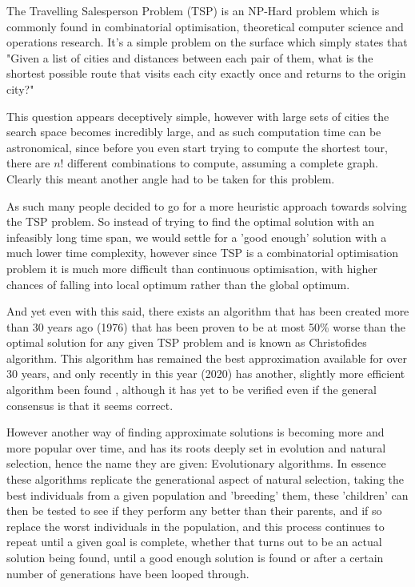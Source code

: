 \documentclass[11pt,a4paper,titlepage]{article}
\begin{document}
The Travelling Salesperson Problem (TSP) is an NP-Hard problem which is commonly found in combinatorial optimisation, theoretical computer science and operations research. It's a simple problem on the surface which simply states that "Given a list of cities and distances between each pair of them, what is the shortest possible route that visits each city exactly once and returns to the origin city?" \cite{TSPWiki}

This question appears deceptively simple, however with large sets of cities the search space becomes incredibly large, and as such computation time can be astronomical, since before you even start trying to compute the shortest tour, there are $n!$ different combinations to compute, assuming a complete graph. Clearly this meant another angle had to be taken for this problem.

As such many people decided to go for a more heuristic approach towards solving the TSP problem. So instead of trying to find the optimal solution with an infeasibly long time span, we would settle for a 'good enough' solution with a much lower time complexity, however since TSP is a combinatorial optimisation problem it is much more difficult than continuous optimisation, with higher chances of falling into local optimum rather than the global optimum.

And yet even with this said, there exists an algorithm that has been created more than 30 years ago (1976) that has been proven to be at most 50\% worse than the optimal solution for any given TSP problem and is known as Christofides algorithm. This algorithm has remained the best approximation available for over 30 years, and only recently in this year (2020) has another, slightly more efficient algorithm been found \cite{TSP2020}, although it has yet to be verified even if the general consensus is that it seems correct.

However another way of finding approximate solutions is becoming more and more popular over time, and has its roots deeply set in evolution and natural selection, hence the name they are given: Evolutionary algorithms. In essence these algorithms replicate the generational aspect of natural selection, taking the best individuals from a given population and 'breeding' them, these 'children' can then be tested to see if they perform any better than their parents, and if so replace the worst individuals in the population, and this process continues to repeat until a given goal is complete, whether that turns out to be an actual solution being found, until a good enough solution is found or after a certain number of generations have been looped through.
\end{document}
